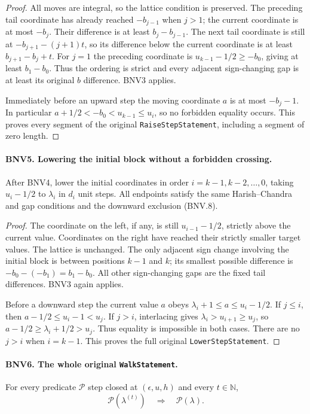\begin{proof}
All moves are integral, so the lattice condition is preserved.  The
preceding tail coordinate has already reached $-b_{j-1}$ when $j>1$;
the current coordinate is at most $-b_j$.  Their difference is at least
$b_j-b_{j-1}$.  The next tail coordinate is still at
$-b_{j+1}-(j+1)t$, so its difference below the current coordinate is at
least $b_{j+1}-b_j+t$.  For $j=1$ the preceding coordinate is
$u_{k-1}-1/2\ge-b_0$, giving at least $b_1-b_0$.  Thus the ordering
is strict and every adjacent sign-changing gap is at least its original
$b$ difference.  BNV3 applies.

Immediately before an upward step the moving coordinate $a$ is at most
$-b_j-1$.  In particular $a+1/2<-b_0<u_{k-1}\le u_i$, so no forbidden
equality occurs.  This proves every segment of the original
\texttt{RaiseStepStatement}, including a segment of zero length.
\end{proof}

\paragraph{BNV5. Lowering the initial block without a forbidden crossing.}
\label{claim:BNV5}
After BNV4, lower the initial coordinates in order
$i=k-1,k-2,\ldots,0$, taking $u_i-1/2$ to $\lambda_i$ in $d_i$ unit
steps.  All endpoints satisfy the same Harish--Chandra and gap conditions
and the downward exclusion (BNV.8).

\begin{proof}
The coordinate on the left, if any, is still $u_{i-1}-1/2$, strictly
above the current value.  Coordinates on the right have reached their
strictly smaller target values.  The lattice is unchanged.  The only
adjacent sign change involving the initial block is between positions
$k-1$ and $k$; its smallest possible difference is
$-b_0-(-b_1)=b_1-b_0$.  All other sign-changing gaps are the fixed tail
differences.  BNV3 again applies.

Before a downward step the current value $a$ obeys
$\lambda_i+1\le a\le u_i-1/2$.  If $j\le i$, then
$a-1/2\le u_i-1<u_j$.  If $j>i$, interlacing gives
$\lambda_i>u_{i+1}\ge u_j$, so
$a-1/2\ge\lambda_i+1/2>u_j$.  Thus equality is impossible in both
cases.  There are no $j>i$ when $i=k-1$.  This proves the full original
\texttt{LowerStepStatement}.
\end{proof}

\paragraph{BNV6. The whole original \texttt{WalkStatement}.}
\label{claim:BNV6}
For every predicate $\mathcal P$ step closed at $(\epsilon,u,h)$ and
every $t\in\mathbb N$,
\[
 \mathcal P(\lambda^{(t)})\quad\Longrightarrow\quad\mathcal P(\lambda).
 \tag{BNV.10}
\]

